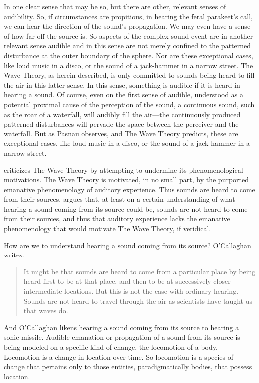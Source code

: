 In one clear sense that may be so, but there are other, relevant senses of audibility. So, if circumstances are propitious, in hearing the feral parakeet's call, we can hear the direction of the sound's propagation. We may even have a sense of how far off the source is. So aspects of the complex sound event are in another relevant sense audible and in this sense are not merely confined to the patterned disturbance at the outer boundary of the sphere. Nor are these exceptional cases, like loud music in a disco, or the sound of a jack-hammer in a narrow street. The Wave Theory, as herein described, is only committed to sounds being heard to fill the air in this latter sense. In this sense, something is audible if it is heard in hearing a sound. Of course, even on the first sense of audible, understood as a potential proximal cause of the perception of the sound, a continuous sound, such as the roar of a waterfall, will audibly fill the air---the continuously produced patterned disturbances will pervade the space between the perceiver and the waterfall. But as Pasnau observes, and The Wave Theory predicts, these are exceptional cases, like loud music in a disco, or the sound of a jack-hammer in a narrow street.

\citet[chapter 3.4]{OCallaghan:2007xy} criticizes The Wave Theory by attempting to undermine its phenomenological motivations. The Wave Theory is motivated, in no small part, by the purported emanative phenomenology of auditory experience. Thus sounds are heard to come from their sources. \citet{OCallaghan:2007xy,OCallaghan:2009aa} argues that, at least on a certain understanding of what hearing a sound coming from its source could be, sounds are not heard to come from their sources, and thus that auditory experience lacks the emanative phenomenology that would motivate The Wave Theory, if veridical.

How are we to understand hearing a sound coming from its source? O'Callaghan writes:
\begin{quote}
	It might be that sounds are heard to come from a particular place by being heard first to be at that place, and then to be at successively closer intermediate locations. But this is not the case with ordinary hearing. Sounds are not heard to travel through the air as scientists have taught us that waves do. \citep[34]{OCallaghan:2007xy}
\end{quote}
And O'Callaghan likens hearing a sound coming from its source to hearing a sonic missile. Audible emanation or propagation of a sound from its source is being modeled on a specific kind of change, the locomotion of a body. Locomotion is a change in location over time. So locomotion is a species of change that pertains only to those entities, paradigmatically bodies, that possess location. 

